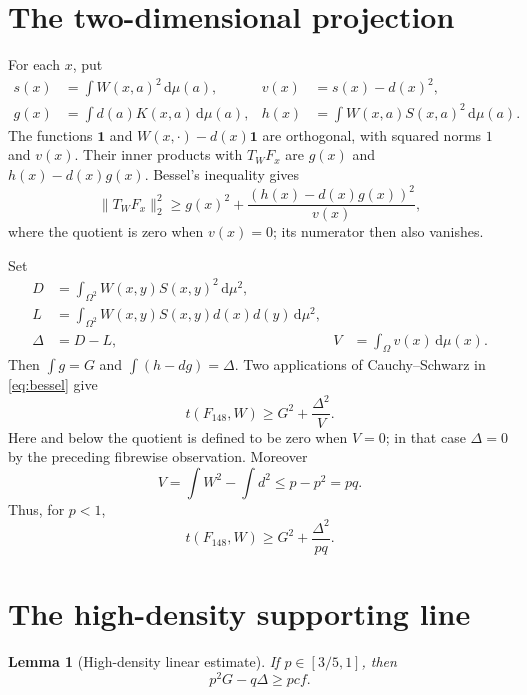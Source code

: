 \documentclass[11pt]{article}
\newtheorem{lemma}[theorem]{Lemma}
\newcommand{\dd}{\,\mathrm d}
\newcommand{\one}{\mathbf 1}
\begin{document}
\section{The two-dimensional projection}

For each $x$, put
\begin{align*}
 s(x)&=\int W(x,a)^2\dd\mu(a),
 &v(x)&=s(x)-d(x)^2,\\
 g(x)&=\int d(a)K(x,a)\dd\mu(a),
 &h(x)&=\int W(x,a)S(x,a)^2\dd\mu(a).
\end{align*}
The functions $\one$ and $W(x,\cdot)-d(x)\one$ are orthogonal, with
squared norms $1$ and $v(x)$.  Their inner products with $T_WF_x$ are
$g(x)$ and $h(x)-d(x)g(x)$.  Bessel's inequality gives
\begin{equation}
 \lVert T_WF_x\rVert_2^2
 \geq g(x)^2+\frac{(h(x)-d(x)g(x))^2}{v(x)},
 \label{eq:bessel}
\end{equation}
where the quotient is zero when $v(x)=0$; its numerator then also vanishes.

Set
\begin{align*}
 D&=\int_{\Omega^2}W(x,y)S(x,y)^2\dd\mu^2,\\
 L&=\int_{\Omega^2}W(x,y)S(x,y)d(x)d(y)\dd\mu^2,\\
 \Delta&=D-L,
 &V&=\int_\Omega v(x)\dd\mu(x).
\end{align*}
Then $\int g=G$ and $\int(h-dg)=\Delta$.  Two applications of
Cauchy--Schwarz in \eqref{eq:bessel} give
\begin{equation}
t(F_{148},W)\geq G^2+\frac{\Delta^2}{V}.
\label{eq:global-projection}
\end{equation}
Here and below the quotient is defined to be zero when $V=0$; in that
case $\Delta=0$ by the preceding fibrewise observation.
Moreover
\[
 V=\int W^2-\int d^2\leq p-p^2=pq.
\]
Thus, for $p<1$,
\begin{equation}
 t(F_{148},W)\geq G^2+\frac{\Delta^2}{pq}.
 \label{eq:coarse-projection}
\end{equation}


\section{The high-density supporting line}

\begin{lemma}[High-density linear estimate]
\label{lem:linear}
If $p\in[3/5,1]$, then
\begin{equation}
 p^2G-q\Delta\geq pcf.
 \label{eq:linear}
\end{equation}
\end{lemma}
\end{document}
